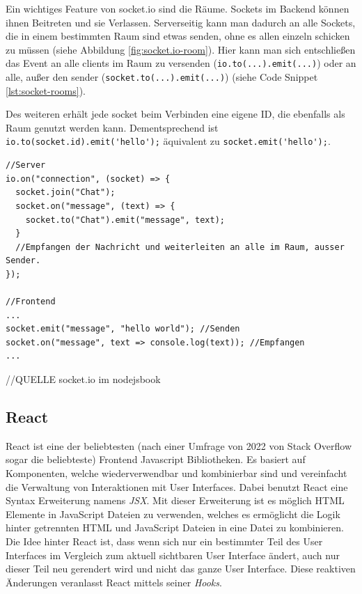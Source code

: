 \documentclass[a4paper,12pt]{report}
\newcommand{\footcite}[1]{\footnotemark\footnotetext{\cite{#1}}}
\begin{document}
Ein wichtiges Feature von socket.io sind die Räume\footcite{socket-rooms}. Sockets im Backend können ihnen Beitreten und sie Verlassen. Serverseitig kann man dadurch an alle Sockets, die in einem bestimmten Raum sind etwas senden, ohne es allen einzeln schicken zu müssen (siehe Abbildung \ref{fig:socket.io-room}). Hier kann man sich entschließen das Event an alle clients im Raum zu versenden (\verb|io.to(...).emit(...)|) oder an alle, außer den sender (\verb|socket.to(...).emit(...)|) (siehe Code Snippet \ref{lst:socket-rooms}).

Des weiteren erhält jede socket beim Verbinden eine eigene ID, die ebenfalls als Raum genutzt werden kann. Dementsprechend ist \verb|io.to(socket.id).emit('hello');| äquivalent zu \verb|socket.emit('hello');|.


\begin{lstlisting}[style=codeStyle, caption={Beispiel zum Beitreten Raums und das senden eines Events in diesen Raum}, label={lst:socket-rooms}]
//Server
io.on("connection", (socket) => {
  socket.join("Chat");
  socket.on("message", (text) => {
  	socket.to("Chat").emit("message", text);
  }
  //Empfangen der Nachricht und weiterleiten an alle im Raum, ausser Sender.
});

//Frontend
...
socket.emit("message", "hello world"); //Senden
socket.on("message", text => console.log(text)); //Empfangen
...
\end{lstlisting}
//QUELLE socket.io im nodejsbook
        \subsection{React}
React ist eine der beliebtesten (nach einer Umfrage von 2022 von Stack Overflow sogar die beliebteste\footcite{stack-overflow-survey}) Frontend Javascript Bibliotheken. Es basiert auf Komponenten, welche wiederverwendbar und kombinierbar sind und vereinfacht die Verwaltung von Interaktionen mit User Interfaces. Dabei benutzt React eine Syntax Erweiterung namens \textit{JSX}. Mit dieser Erweiterung ist es möglich HTML Elemente in JavaScript Dateien zu verwenden, welches es ermöglicht die Logik hinter getrennten HTML und JavaScript Dateien in eine Datei zu kombinieren. Die Idee hinter React ist, dass wenn sich nur ein bestimmter Teil des User Interfaces im Vergleich zum aktuell sichtbaren User Interface ändert, auch nur dieser Teil neu gerendert wird und nicht das ganze User Interface. Diese reaktiven Änderungen veranlasst React mittels seiner \textit{Hooks}.
\end{document}
